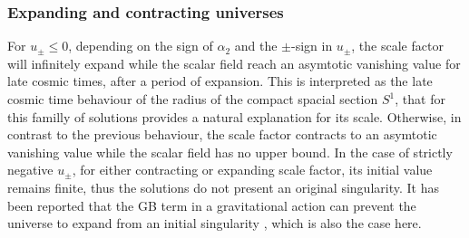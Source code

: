 \documentclass[aps,prd,12pt,superscriptaddress,showpacs,showkeys,longbibliography,reprint]{revtex4-1}
\begin{document}
\subsubsection{Expanding and contracting universes}
For $u_\pm\leq 0$, depending on the sign of $\alpha_2$ and the $\pm$-sign in $u_\pm$, the scale factor will infinitely expand while the scalar field reach an asymtotic vanishing value for late cosmic times, after a period of expansion. This is interpreted as the late cosmic time behaviour of the radius of the compact spacial section $S^1$, that for this familly of solutions provides a natural explanation for its scale. Otherwise, in contrast to the previous behaviour, the scale factor contracts to an asymtotic vanishing value while the scalar field has no upper bound. In the case of strictly negative $u_\pm$, for either contracting or expanding scale factor, its initial value remains finite, thus the solutions do not present an original singularity. It has been reported that the GB term in a gravitational action can prevent the universe to expand from an initial singularity \cite{Deruelle:1986iv,Henriques:1986jw,Ishihara:1986if}, which is also the case here. 
\end{document}
